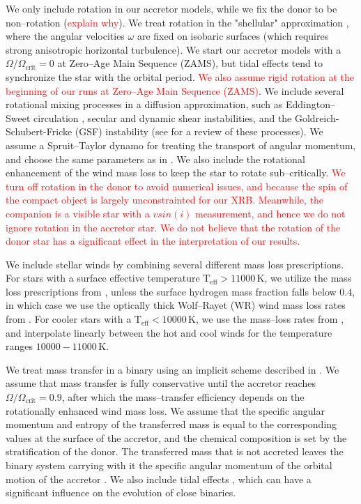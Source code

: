\documentclass[linenumbers,trackchanges,twocolumn]{aastex701}
\newcommand{\red}{\textcolor{red}}
\begin{document}
We only include rotation in our accretor models, while we fix the donor to be non--rotation (\red{explain why}). We treat rotation in the "shellular" approximation \cite{1992A&A...265..115Z,2012A&A...537A.146E}, where the angular velocities $\omega$ are fixed on isobaric surfaces (which requires strong anisotropic horizontal turbulence). We start our accretor models with a $\Omega/\Omega_{\mathrm{crit}} = 0$ at Zero--Age Main Sequence (ZAMS), but tidal effects tend to synchronize the star with the orbital period. \red{We also assume rigid rotation at the beginning of our runs at Zero--Age Main Sequence (ZAMS)}. We include several rotational mixing processes in a diffusion approximation, such as Eddington--Sweet circulation \cite{1950MNRAS.110..548S}, secular and dynamic shear instabilities, and the Goldreich-Schubert-Fricke (GSF) instability (see \cite{2000ApJ...528..368H} for a review of these processes). We assume a Spruit--Taylor dynamo \cite{2002A&A...381..923S} for treating the transport of angular momentum, and choose the same parameters as in \cite{2000ApJ...528..368H}. We also include the rotational enhancement of the wind mass loss \cite{1998A&A...329..551L} to keep the star to rotate sub--critically.  \red{We turn off rotation in the donor to avoid numerical issues, and because the spin of the compact object is largely unconstrainted for our XRB. Meanwhile, the companion is a visible star with a $vsin(i)$ measurement, and hence we do not ignore rotation in the accretor star. We do not believe that the rotation of the donor star has a significant effect in the interpretation of our results.} 

We include stellar winds by combining several different mass loss prescriptions. For stars with a surface effective temperature $\mathrm{T_{eff}} > 11000\,\mathrm{K}$, we utilize the mass loss prescriptions from \cite{2023A&A...676A.109B}, unless the surface hydrogen mass fraction falls below $0.4$, in which case we use the optically thick Wolf--Rayet (WR) wind mass loss rates from \cite{2000A&A...360..227N}. For cooler stars with a $\mathrm{T_{eff}} < 10000\,\mathrm{K}$, we use the mass--loss rates from \cite{2024A&A...681A..17D}, and interpolate linearly between the hot and cool winds for the temperature ranges $10000-11000\,\mathrm{K}$.

We treat mass transfer in a binary using an implicit scheme described in \cite{1990A&A...236..385K}. We assume that mass transfer is fully conservative until the accretor reaches $\Omega/\Omega_{\mathrm{crit}} = 0.9$, after which the mass--transfer efficiency depends on the rotationally enhanced wind mass loss. We assume that the specific angular momentum and entropy of the transferred mass is equal to the corresponding values at the surface of the accretor, and the chemical composition is set by the stratification of the donor. The transferred mass that is not accreted leaves the binary system carrying with it the specific angular momentum of the orbital motion of the accretor \cite{1997A&A...327..620S,2017MNRAS.471.4256V}. We also include tidal effects \cite{1981A&A....99..126H}, which can have a significant influence on the evolution of close binaries.
\end{document}
